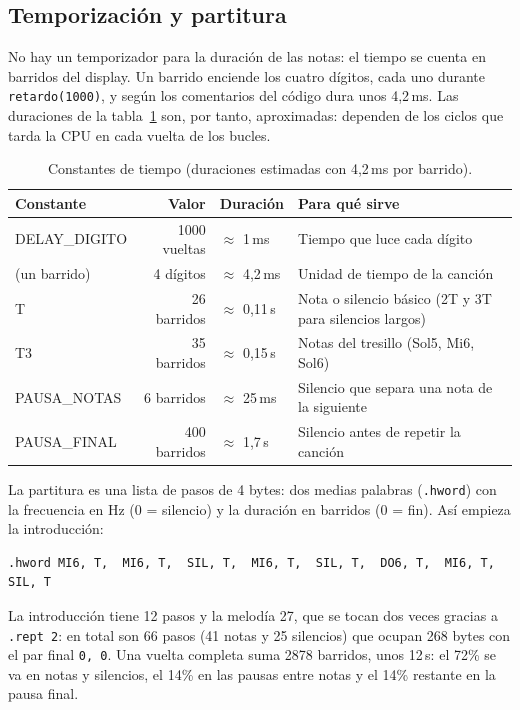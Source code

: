 \documentclass[11pt,letterpaper]{article}
\begin{document}
\subsection{Temporización y partitura}

No hay un temporizador para la duración de las notas: el tiempo se cuenta en barridos del display. Un
barrido enciende los cuatro dígitos, cada uno durante \texttt{retardo(1000)}, y según los comentarios del
código dura unos 4,2\,ms. Las duraciones de la tabla~\ref{tab:tiempos} son, por tanto, aproximadas: dependen
de los ciclos que tarda la CPU en cada vuelta de los bucles.

\begin{table}[H]
  \centering\small
  \caption{Constantes de tiempo (duraciones estimadas con 4,2\,ms por barrido).}
  \label{tab:tiempos}
  \begin{tabular}{@{}>{\ttfamily}l r l l@{}}
    \toprule
    \normalfont Constante & Valor & Duración & Para qué sirve \\
    \midrule
    DELAY\_DIGITO & 1000 vueltas & $\approx$ 1\,ms & Tiempo que luce cada dígito \\
    \normalfont(un barrido) & 4 dígitos & $\approx$ 4,2\,ms & Unidad de tiempo de la canción \\
    T            & 26 barridos  & $\approx$ 0,11\,s & Nota o silencio básico (2T y 3T para silencios largos) \\
    T3           & 35 barridos  & $\approx$ 0,15\,s & Notas del tresillo (Sol5, Mi6, Sol6) \\
    PAUSA\_NOTAS & 6 barridos   & $\approx$ 25\,ms  & Silencio que separa una nota de la siguiente \\
    PAUSA\_FINAL & 400 barridos & $\approx$ 1,7\,s  & Silencio antes de repetir la canción \\
    \bottomrule
  \end{tabular}
\end{table}

La partitura es una lista de pasos de 4 bytes: dos medias palabras (\texttt{.hword}) con la frecuencia en Hz
(0 = silencio) y la duración en barridos (0 = fin). Así empieza la introducción:

\begin{lstlisting}[numbers=none, frame=none, xleftmargin=1.2em]
.hword MI6, T,  MI6, T,  SIL, T,  MI6, T,  SIL, T,  DO6, T,  MI6, T,  SIL, T
\end{lstlisting}

La introducción tiene 12 pasos y la melodía 27, que se tocan dos veces gracias a \texttt{.rept 2}: en total
son 66 pasos (41 notas y 25 silencios) que ocupan 268 bytes con el par final \texttt{0, 0}. Una vuelta
completa suma 2878 barridos, unos 12\,s: el 72\% se va en notas y silencios, el 14\% en las pausas entre
notas y el 14\% restante en la pausa final.
\end{document}
